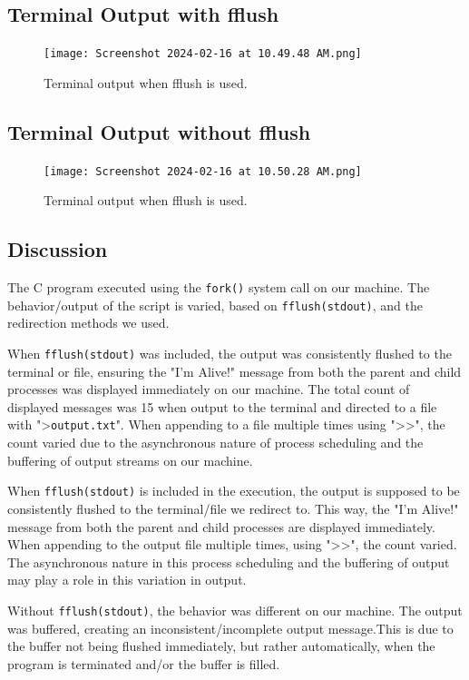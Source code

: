 \documentclass[12pt]{article}
\begin{document}
\newpage
  \subsection{Terminal Output with fflush}
    \begin{figure}[h]
    \centering
    \texttt{[image: Screenshot 2024-02-16 at 10.49.48 AM.png]}
    \caption{Terminal output when fflush is used.}
    \end{figure}

\subsection{Terminal Output without fflush}
\begin{figure}[h]
\centering
\texttt{[image: Screenshot 2024-02-16 at 10.50.28 AM.png]}
\caption{Terminal output when fflush is used.}
\end{figure}

\newpage
  \subsection{Discussion}
The C program executed using the \texttt{fork()} system call on our machine. The behavior/output of the script is varied, based on \texttt{fflush(stdout)}, and the redirection methods we used. 

When \texttt{fflush(stdout)} was included, the output was consistently flushed to the terminal or file, ensuring the "I'm Alive!" message from both the parent and child processes was displayed immediately on our machine. The total count of displayed messages was 15 when output to the terminal and directed to a file with ">\texttt{output.txt}". When appending to a file multiple times using ">>", the count varied due to the asynchronous nature of process scheduling and the buffering of output streams on our machine.

When \texttt{fflush(stdout)} is included in the execution, the output is supposed to be consistently flushed to the terminal/file we redirect to. This way, the "I'm Alive!" message from both the parent and child processes are displayed immediately. When appending to the output file multiple times, using ">>", the count varied. The asynchronous nature in this process scheduling and the buffering of output may play a role in this variation in output. 

Without \texttt{fflush(stdout)}, the behavior was different on our machine. The output was buffered, creating an inconsistent/incomplete output message.This is due to the buffer not being flushed immediately, but rather automatically, when the program is terminated and/or the buffer is filled.
\end{document}
